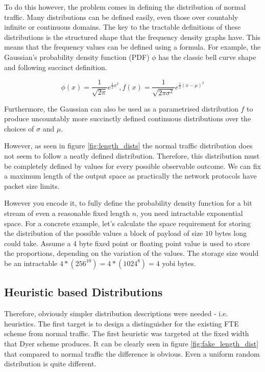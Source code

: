 \documentclass[ %
                    author={Samuel Russell},
                supervisor={Prof. Bogdan Warinschi},
                    degree={MEng},
                     title={Innocuous Ciphertexts},
                  subtitle={The DE-CENSOR Scheme},
                      type={research},
                      year={2018} ]{dissertation}
\begin{document}
To do this however, the problem comes in defining the distribution of normal traffic.
Many distributions can be defined easily, even those over countably infinite or continuous domains.
The key to the tractable definitions of these distributions is the structured shape that the frequency density graphs have.
This means that the frequency values can be defined using a formula.
For example, the Gaussian's probability density function (PDF) $\phi$ has the classic bell curve shape and following succinct definition.

$$\phi (x) = \frac{1}{\sqrt{2\pi}}e^{\frac{1}{2}x^2}, f(x) = \frac{1}{\sqrt{2\pi\sigma^2}}e^{\frac{1}{2}(x-\mu)^2}$$

Furthermore, the Gaussian can also be used as a parametrised distribution $f$ to produce uncountably more succinctly defined continuous distributions over the choices of $\sigma$ and $\mu$.

However, as seen in figure \ref{fig:length_dists} the normal traffic distribution does not seem to follow a neatly defined distribution.
Therefore, this distribution must be completely defined by values for every possible observable outcome.
We can fix a maximum length of the output space as practically the network protocols have packet size limits. 

However you encode it, to fully define the probability density function for a bit stream of even a reasonable fixed length $n$, you need intractable exponential space.
For a concrete example, let's calculate the space requirement for storing the distribution of the possible values a block of payload of size $10$ bytes long could take.
Assume a 4 byte fixed point or floating point value is used to store the proportions, depending on the variation of the values.
The storage size would be an intractable $4*(256^10) = 4*(1024^8) = 4$ yobi bytes.

\subsection{Heuristic based Distributions}

Therefore, obviously simpler distribution descriptions were needed - i.e. heuristics.
The first target is to design a distinguisher for the existing FTE scheme from normal traffic.
The first heuristic was targeted at the fixed width that Dyer scheme produces.
It can be clearly seen in figure \ref{fig:fake_length_dist} that compared to normal traffic the difference is obvious.
Even a uniform random distribution is quite different.
\end{document}
